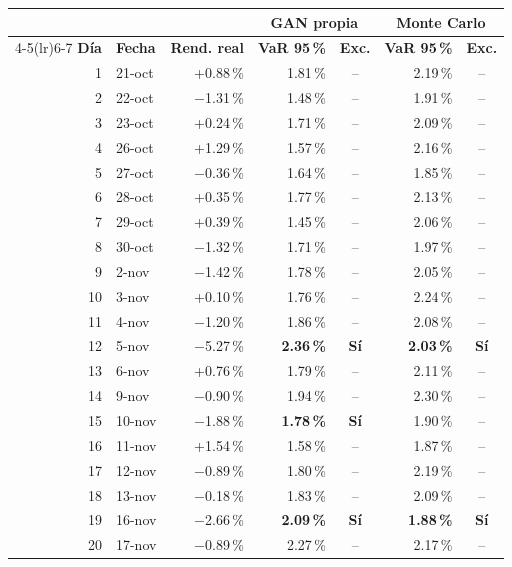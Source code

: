 \begin{tabular}{@{}rlrrcrc@{}}
\toprule
 & & & \multicolumn{2}{c}{\textbf{GAN propia}} & \multicolumn{2}{c}{\textbf{Monte Carlo}} \\
\cmidrule(lr){4-5}\cmidrule(lr){6-7}
\textbf{Día} & \textbf{Fecha} & \textbf{Rend. real} & \textbf{VaR 95\,\%} & \textbf{Exc.} & \textbf{VaR 95\,\%} & \textbf{Exc.} \\
\midrule
1 & 21-oct & +0.88\,\% & 1.81\,\% & -- & 2.19\,\% & -- \\
2 & 22-oct & $-$1.31\,\% & 1.48\,\% & -- & 1.91\,\% & -- \\
3 & 23-oct & +0.24\,\% & 1.71\,\% & -- & 2.09\,\% & -- \\
4 & 26-oct & +1.29\,\% & 1.57\,\% & -- & 2.16\,\% & -- \\
5 & 27-oct & $-$0.36\,\% & 1.64\,\% & -- & 1.85\,\% & -- \\
6 & 28-oct & +0.35\,\% & 1.77\,\% & -- & 2.13\,\% & -- \\
7 & 29-oct & +0.39\,\% & 1.45\,\% & -- & 2.06\,\% & -- \\
8 & 30-oct & $-$1.32\,\% & 1.71\,\% & -- & 1.97\,\% & -- \\
9 & 2-nov & $-$1.42\,\% & 1.78\,\% & -- & 2.05\,\% & -- \\
10 & 3-nov & +0.10\,\% & 1.76\,\% & -- & 2.24\,\% & -- \\
11 & 4-nov & $-$1.20\,\% & 1.86\,\% & -- & 2.08\,\% & -- \\
12 & 5-nov & $-$5.27\,\% & \textbf{2.36\,\%} & \textbf{Sí} & \textbf{2.03\,\%} & \textbf{Sí} \\
13 & 6-nov & +0.76\,\% & 1.79\,\% & -- & 2.11\,\% & -- \\
14 & 9-nov & $-$0.90\,\% & 1.94\,\% & -- & 2.30\,\% & -- \\
15 & 10-nov & $-$1.88\,\% & \textbf{1.78\,\%} & \textbf{Sí} & 1.90\,\% & -- \\
16 & 11-nov & +1.54\,\% & 1.58\,\% & -- & 1.87\,\% & -- \\
17 & 12-nov & $-$0.89\,\% & 1.80\,\% & -- & 2.19\,\% & -- \\
18 & 13-nov & $-$0.18\,\% & 1.83\,\% & -- & 2.09\,\% & -- \\
19 & 16-nov & $-$2.66\,\% & \textbf{2.09\,\%} & \textbf{Sí} & \textbf{1.88\,\%} & \textbf{Sí} \\
20 & 17-nov & $-$0.89\,\% & 2.27\,\% & -- & 2.17\,\% & -- \\
\bottomrule
\end{tabular}
